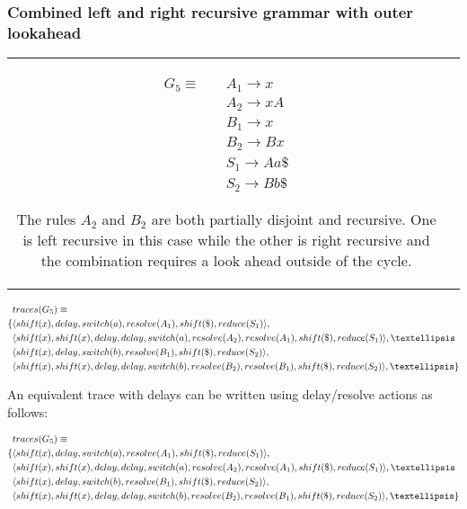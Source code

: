 \documentclass[11pt]{article}
\begin{document}
\subsubsection{Combined left and right recursive grammar with outer lookahead}
\begin{tabular}[t]{cl}
\parbox{.3\textwidth}{
\begin{align*}
G_5 \equiv \quad & A_1 \rightarrow x\\
                 & A_2 \rightarrow x A\\
                 & B_1 \rightarrow x\\
                 & B_2 \rightarrow B x\\
                 & S_1 \rightarrow A a \$\\
                 & S_2 \rightarrow B b \$
\end{align*}}
\parbox{.8\textwidth}{The rules $A_2$ and $B_2$ are both partially disjoint and recursive. One is left recursive in this case while the other is right recursive and the combination
requires a look ahead outside of the cycle.}
\end{tabular}

\parbox{.3\textwidth}{\begin{align*}
&traces(G_5) \equiv \\
\{ & \langle shift(x), delay, switch(a), resolve(A_1), shift(\$), reduce(S_1) \rangle,\\
   & \langle shift(x), shift(x), delay, delay, switch(a), resolve(A_2), resolve(A_1), shift(\$), reduce(S_1) \rangle, \textellipsis \\
   & \langle shift(x), delay, switch(b), resolve(B_1), shift(\$), reduce(S_2) \rangle,\\
   & \langle shift(x), shift(x), delay, delay, switch(b), resolve(B_2), resolve(B_1), shift(\$), reduce(S_2) \rangle, \textellipsis \}
\end{align*}}

An equivalent trace with delays can be written using delay/resolve actions as follows:

\parbox{.3\textwidth}{\begin{align*}
&traces(G_5) \equiv \\
\{ & \langle shift(x), delay, switch(a), resolve(A_1), shift(\$), reduce(S_1) \rangle,\\
   & \langle shift(x), shift(x), delay, delay, switch(a), resolve(A_2), resolve(A_1), shift(\$), reduce(S_1) \rangle, \textellipsis \\
   & \langle shift(x), delay, switch(b), resolve(B_1), shift(\$), reduce(S_2) \rangle,\\
   & \langle shift(x), shift(x), delay, delay, switch(b), resolve(B_2), resolve(B_1), shift(\$), reduce(S_2) \rangle, \textellipsis \}
\end{align*}}
\end{document}
